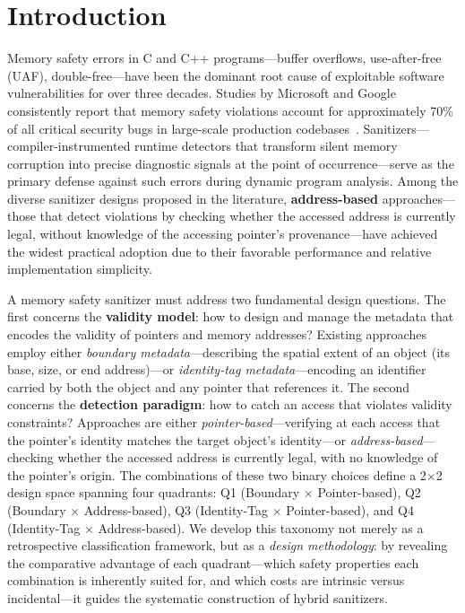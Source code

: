 \documentclass[cmc,article,submit,moreauthors,pdftex]{Definitions/tsp}
\begin{document}
\section{Introduction} \label{sect:intro}

Memory safety errors in C and C++ programs---buffer overflows, use-after-free (UAF), double-free---have been the dominant root cause of exploitable software vulnerabilities for over three decades. Studies by Microsoft and Google consistently report that memory safety violations account for approximately 70\% of all critical security bugs in large-scale production codebases~\cite{msrc2019,chromium2020}. Sanitizers---compiler-instrumented runtime detectors that transform silent memory corruption into precise diagnostic signals at the point of occurrence---serve as the primary defense against such errors during dynamic program analysis. Among the diverse sanitizer designs proposed in the literature, \textbf{address-based} approaches---those that detect violations by checking whether the accessed address is currently legal, without knowledge of the accessing pointer's provenance---have achieved the widest practical adoption due to their favorable performance and relative implementation simplicity.

A memory safety sanitizer must address two fundamental design questions. The first concerns the \textbf{validity model}: how to design and manage the metadata that encodes the validity of pointers and memory addresses? Existing approaches employ either \emph{boundary metadata}---describing the spatial extent of an object (its base, size, or end address)---or \emph{identity-tag metadata}---encoding an identifier carried by both the object and any pointer that references it. The second concerns the \textbf{detection paradigm}: how to catch an access that violates validity constraints? Approaches are either \emph{pointer-based}---verifying at each access that the pointer's identity matches the target object's identity---or \emph{address-based}---checking whether the accessed address is currently legal, with no knowledge of the pointer's origin. The combinations of these two binary choices define a 2$\times$2 design space spanning four quadrants: Q1 (Boundary $\times$ Pointer-based), Q2 (Boundary $\times$ Address-based), Q3 (Identity-Tag $\times$ Pointer-based), and Q4 (Identity-Tag $\times$ Address-based). We develop this taxonomy not merely as a retrospective classification framework, but as a \emph{design methodology}: by revealing the comparative advantage of each quadrant---which safety properties each combination is inherently suited for, and which costs are intrinsic versus incidental---it guides the systematic construction of hybrid sanitizers.
\end{document}
